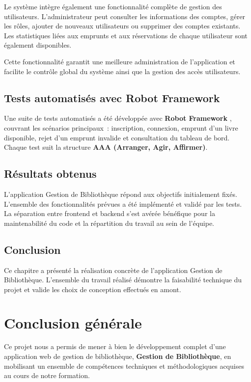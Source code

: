 ﻿\documentclass[12pt,a4paper]{report}
\begin{document}
Le système intègre également une fonctionnalité complète de gestion des utilisateurs. L’administrateur peut consulter les informations des comptes, gérer les rôles, ajouter de nouveaux utilisateurs ou supprimer des comptes existants. Les statistiques liées aux emprunts et aux réservations de chaque utilisateur sont également disponibles.

Cette fonctionnalité garantit une meilleure administration de l’application et facilite le contrôle global du système ainsi que la gestion des accès utilisateurs.

\section{Tests automatisés avec Robot Framework}

Une suite de tests automatisés a été développée avec \textbf{Robot Framework}
\cite{robot}, couvrant les scénarios principaux~: inscription, connexion, emprunt d'un
livre disponible, rejet d'un emprunt invalide et consultation du tableau de bord.
Chaque test suit la structure \textbf{AAA (Arranger, Agir, Affirmer)}.

\section{Résultats obtenus}

L'application Gestion de Bibliothèque répond aux objectifs initialement fixés. L'ensemble des
fonctionnalités prévues a été implémenté et validé par les tests.
La séparation entre frontend et backend s'est avérée bénéfique pour la
maintenabilité du code et la répartition du travail au sein de l'équipe.

\section{Conclusion}

Ce chapitre a présenté la réalisation concrète de l'application Gestion de Bibliothèque.
L'ensemble du travail réalisé démontre la faisabilité technique du projet
et valide les choix de conception effectués en amont.

\chapter*{Conclusion générale}

Ce projet nous a permis de mener à bien le développement complet d'une application
web de gestion de bibliothèque, \textbf{Gestion de Bibliothèque}, en mobilisant un ensemble de
compétences techniques et méthodologiques acquises au cours de notre formation.
\end{document}
